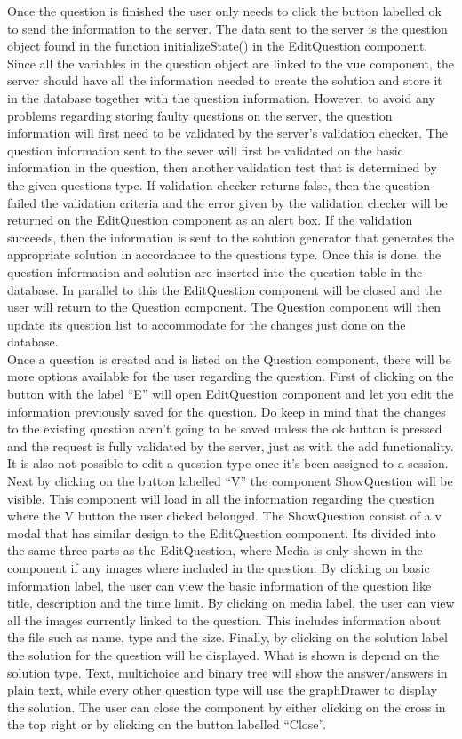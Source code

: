 Once the question is finished the user only needs to click the button labelled ok to send the information to the server. The data sent to the server is the question object found in the function initializeState() in the EditQuestion component. Since all the variables in the question object are linked to the vue component, the server should have all the information needed to create the solution and store it in the database together with the question information. However, to avoid any problems regarding storing faulty questions on the server, the question information will first need to be validated by the server’s validation checker. The question information sent to the sever will first be validated on the basic information in the question, then another validation test that is determined by the given questions type.  If validation checker returns false, then the question failed the validation criteria and the error given by the validation checker will be returned on the EditQuestion component as an alert box. If the validation succeeds, then the information is sent to the solution generator that generates the appropriate solution in accordance to the questions type. Once this is done, the question information and solution are inserted into the question table in the database. In parallel to this the EditQuestion component will be closed and the user will return to the Question component. The Question component will then update its question list to accommodate for the changes just done on the database.
\\[11pt]
Once a question is created and is listed on the Question component, there will be more options available for the user regarding the question. First of clicking on the button with the label “E” will open EditQuestion component and let you edit the information previously saved for the question. Do keep in mind that the changes to the existing question aren’t going to be saved unless the ok button is pressed and the request is fully validated by the server, just as with the add functionality. It is also not possible to edit a question type once it’s been assigned to a session. \\[11pt]
Next by clicking on the button labelled “V” the component ShowQuestion will be visible. This component will load in all the information regarding the question where the V button the user clicked belonged. The ShowQuestion consist of a v modal that has similar design to the EditQuestion component. Its divided into the same three parts as the EditQuestion, where Media is only shown in the component if any images where included in the question. By clicking on basic information label, the user can view the basic information of the question like title, description and the time limit. By clicking on media label, the user can view all the images currently linked to the question. This includes information about the file such as name, type and the size. Finally, by clicking on the solution label the solution for the question will be displayed. What is shown is depend on the solution type. Text, multichoice and binary tree will show the answer/answers in plain text, while every other question type will use the graphDrawer to display the solution. The user can close the component by either clicking on the cross in the top right or by clicking on the button labelled “Close”. 
